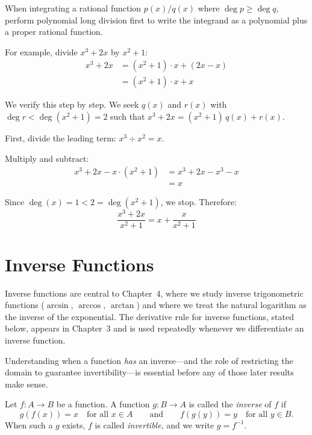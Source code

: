\begin{remark}
When integrating a rational function $p(x)/q(x)$ where
$\deg p \geq \deg q$, perform polynomial long division first to write
the integrand as a polynomial plus a proper rational function.

For example, divide $x^3 + 2x$ by $x^2 + 1$:
\begin{align*}
  x^3 + 2x &= (x^2 + 1) \cdot x + (2x - x) \\
            &= (x^2 + 1) \cdot x + x
\end{align*}

We verify this step by step. We seek $q(x)$ and $r(x)$ with
$\deg r < \deg(x^2 + 1) = 2$ such that $x^3 + 2x = (x^2+1)\,q(x) + r(x)$.

First, divide the leading term: $x^3 \div x^2 = x$.

Multiply and subtract:
\begin{align*}
  x^3 + 2x - x \cdot (x^2 + 1)
    &= x^3 + 2x - x^3 - x \\
    &= x
\end{align*}

Since $\deg(x) = 1 < 2 = \deg(x^2+1)$, we stop. Therefore:
\[
  \dfrac{x^3 + 2x}{x^2 + 1} = x + \dfrac{x}{x^2 + 1}
\]
\end{remark}

\section{Inverse Functions}
\label{sec:A.4}

Inverse functions are central to Chapter~4, where we study inverse
trigonometric functions ($\arcsin$, $\arccos$, $\arctan$) and where we
treat the natural logarithm as the inverse of the exponential. The
derivative rule for inverse functions, stated below, appears in Chapter~3
and is used repeatedly whenever we differentiate an inverse function.

Understanding when a function \textit{has} an inverse---and the role of
restricting the domain to guarantee invertibility---is essential before
any of those later results make sense.

\begin{definition}\label{def:A-1}
Let $f \colon A \to B$ be a function. A function $g \colon B \to A$
is called the \emph{inverse} of $f$ if
\[
  g(f(x)) = x \quad \text{for all } x \in A
  \qquad \text{and} \qquad
  f(g(y)) = y \quad \text{for all } y \in B.
\]
When such a $g$ exists, $f$ is called \emph{invertible}, and we write
$g = f^{-1}$.
\end{definition}

